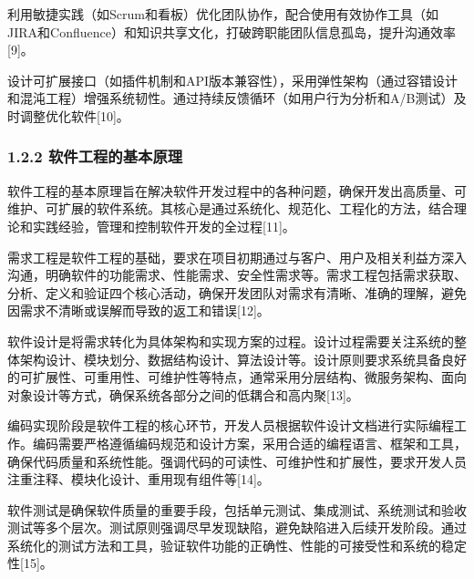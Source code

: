 利用敏捷实践（如Scrum和看板）优化团队协作，配合使用有效协作工具（如JIRA和Confluence）和知识共享文化，打破跨职能团队信息孤岛，提升沟通效率{[}9{]}。


设计可扩展接口（如插件机制和API版本兼容性），采用弹性架构（通过容错设计和混沌工程）增强系统韧性。通过持续反馈循环（如用户行为分析和A/B测试）及时调整优化软件{[}10{]}。

\hypertarget{ux8f6fux4ef6ux5de5ux7a0bux7684ux57faux672cux539fux7406}{%
\subsubsection{1.2.2 软件工程的基本原理}\label{ux8f6fux4ef6ux5de5ux7a0bux7684ux57faux672cux539fux7406}}

软件工程的基本原理旨在解决软件开发过程中的各种问题，确保开发出高质量、可维护、可扩展的软件系统。其核心是通过系统化、规范化、工程化的方法，结合理论和实践经验，管理和控制软件开发的全过程{[}11{]}。


需求工程是软件工程的基础，要求在项目初期通过与客户、用户及相关利益方深入沟通，明确软件的功能需求、性能需求、安全性需求等。需求工程包括需求获取、分析、定义和验证四个核心活动，确保开发团队对需求有清晰、准确的理解，避免因需求不清晰或误解而导致的返工和错误{[}12{]}。


软件设计是将需求转化为具体架构和实现方案的过程。设计过程需要关注系统的整体架构设计、模块划分、数据结构设计、算法设计等。设计原则要求系统具备良好的可扩展性、可重用性、可维护性等特点，通常采用分层结构、微服务架构、面向对象设计等方式，确保系统各部分之间的低耦合和高内聚{[}13{]}。


编码实现阶段是软件工程的核心环节，开发人员根据软件设计文档进行实际编程工作。编码需要严格遵循编码规范和设计方案，采用合适的编程语言、框架和工具，确保代码质量和系统性能。强调代码的可读性、可维护性和扩展性，要求开发人员注重注释、模块化设计、重用现有组件等{[}14{]}。


软件测试是确保软件质量的重要手段，包括单元测试、集成测试、系统测试和验收测试等多个层次。测试原则强调尽早发现缺陷，避免缺陷进入后续开发阶段。通过系统化的测试方法和工具，验证软件功能的正确性、性能的可接受性和系统的稳定性{[}15{]}。


